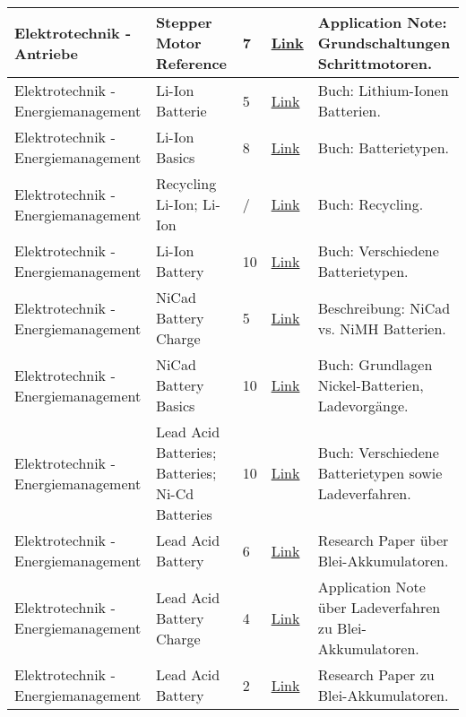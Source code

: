 \documentclass[../main.tex]{subfiles}
\begin{document}
\begin{longtable}{@{} L{2.5cm} L{2.9cm} C{1cm} L{1.2cm} L{6cm} @{}}
Elektrotechnik - Antriebe & Stepper Motor Reference & 7 & \href{https://www.silabs.com/documents/public/application-notes/an155.pdf}{Link} & Application Note: Grundschaltungen Schrittmotoren. \\
\hline
Elektrotechnik - Energiemanagement & Li-Ion Batterie & 5 & \href{https://learning.oreilly.com/library/view/lithium-ion-batteries/9781466557338/}{Link} & Buch: Lithium-Ionen Batterien. \\
\hline
Elektrotechnik - Energiemanagement & Li-Ion Basics & 8 & \href{https://link.springer.com/book/10.1007/978-3-662-53071-9}{Link} & Buch: Batterietypen. \\
\hline
Elektrotechnik - Energiemanagement & Recycling Li-Ion; Li-Ion & / & \href{https://link.springer.com/book/10.1007/978-3-319-70572-9}{Link} & Buch: Recycling. \\
\hline
Elektrotechnik - Energiemanagement & Li-Ion Battery & 10 & \href{https://learning.oreilly.com/library/view/fundamentals-and-applications/9781118414781/}{Link} & Buch: Verschiedene Batterietypen. \\
\hline
Elektrotechnik - Energiemanagement & NiCad Battery Charge & 5 & \href{https://www.servocity.com/nicad-vs-nimh-batteries}{Link} & Beschreibung: NiCad vs. NiMH Batterien. \\
\hline
Elektrotechnik - Energiemanagement & NiCad Battery Basics & 10 & \href{https://learning.oreilly.com/library/view/rechargeable-batteries-applications/9780750670067/}{Link} & Buch: Grundlagen Nickel-Batterien, Ladevorgänge. \\
\hline
Elektrotechnik - Energiemanagement & Lead Acid Batteries; Batteries; Ni-Cd Batteries & 10 & \href{https://app.knovel.com/kn/resources/kpRBHPA003/toc}{Link} & Buch: Verschiedene Batterietypen sowie Ladeverfahren. \\
\hline
Elektrotechnik - Energiemanagement & Lead Acid Battery & 6 & \href{https://www.researchgate.net/publication/357913548\_LEAD-ACID\_BATTERY}{Link} & Research Paper über Blei-Akkumulatoren. \\
\hline
Elektrotechnik - Energiemanagement & Lead Acid Battery Charge & 4 & \href{https://www.ti.com/lit/an/slua055/slua055.pdf}{Link} & Application Note über Ladeverfahren zu Blei-Akkumulatoren. \\
\hline
Elektrotechnik - Energiemanagement & Lead Acid Battery & 2 & \href{https://ieeexplore.ieee.org/document/8684661}{Link} & Research Paper zu Blei-Akkumulatoren. \\


\end{longtable}
\end{document}

